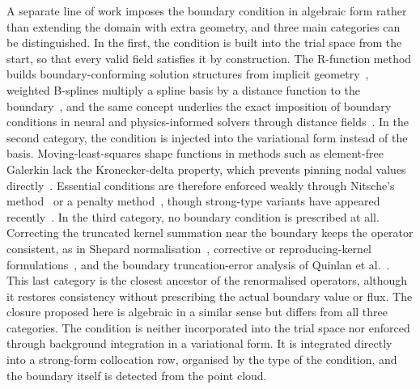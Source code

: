 \documentclass[preprint,review,12pt]{elsarticle}
\begin{document}
A separate line of work imposes the boundary condition in algebraic form rather than extending the domain with extra geometry, and three main categories can be distinguished.
In the first, the condition is built into the trial space from the start, so that every valid field satisfies it by construction.
The R-function method builds boundary-conforming solution structures from implicit geometry~\cite{Shapiro2007,ShapiroTsukanov1999}, weighted B-splines multiply a spline basis by a distance function to the boundary~\cite{Hoellig2003}, and the same concept underlies the exact imposition of boundary conditions in neural and physics-informed solvers through distance fields~\cite{Lagaris1998,SukumarSrivastava2022}.
In the second category, the condition is injected into the variational form instead of the basis.
Moving-least-squares shape functions in methods such as element-free Galerkin lack the Kronecker-delta property, which prevents pinning nodal values directly~\cite{Belytschko1994,FernandezMendez2004}.
Essential conditions are therefore enforced weakly through Nitsche's method~\cite{Nitsche1971} or a penalty method~\cite{Atluri1998}, though strong-type variants have appeared recently~\cite{Hillman2021}.
In the third category, no boundary condition is prescribed at all.
Correcting the truncated kernel summation near the boundary keeps the operator consistent, as in Shepard normalisation~\cite{Shepard1968}, corrective or reproducing-kernel formulations~\cite{Chen1999}, and the boundary truncation-error analysis of Quinlan et al.~\cite{Quinlan2006}.
This last category is the closest ancestor of the renormalised operators, although it restores consistency without prescribing the actual boundary value or flux.
The closure proposed here is algebraic in a similar sense but differs from all three categories.
The condition is neither incorporated into the trial space nor enforced through background integration in a variational form.
It is integrated directly into a strong-form collocation row, organised by the type of the condition, and the boundary itself is detected from the point cloud.
\end{document}

